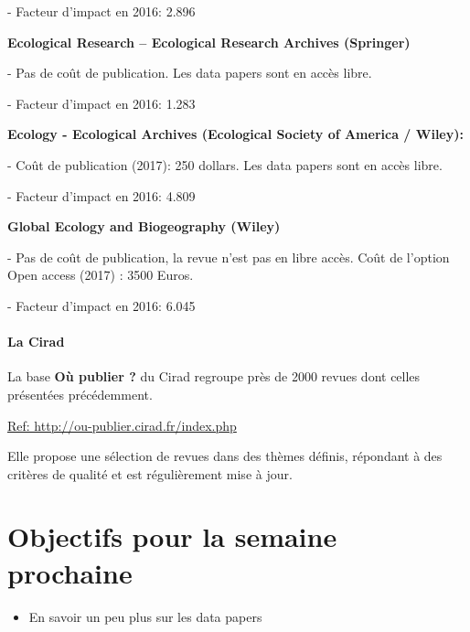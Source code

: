 \documentclass[11pt,oneside]{article}
\begin{document}
-	Facteur d'impact en 2016: 2.896

\begin{flushleft}
\textbf{Ecological Research – Ecological Research Archives (Springer) }
\end{flushleft}

-	Pas de coût de publication. Les data papers sont en accès libre.

-	Facteur d'impact en 2016: 1.283

\begin{flushleft}
\textbf{Ecology - Ecological Archives (Ecological Society of America / Wiley): }
\end{flushleft}

-	Coût de publication (2017): 250 dollars. Les data papers
sont en accès libre.

-	Facteur d'impact en 2016: 4.809

\begin{flushleft}
\textbf{Global Ecology and Biogeography (Wiley)}
\end{flushleft}

-	Pas de coût de publication, la revue n’est pas en libre accès. Coût de l’option Open access
(2017) : 3500 Euros.

-	Facteur d'impact en 2016: 6.045

\newpage

\subsection*{La Cirad}

\begin{flushleft}
La base \textbf{Où publier ?} du Cirad regroupe près de 2000 revues dont celles présentées précédemment.
\end{flushleft}


\begin{flushleft}
\url{ Ref: http://ou-publier.cirad.fr/index.php}
\end{flushleft}

Elle propose une sélection de revues dans des thèmes définis, répondant à des critères de qualité et est régulièrement mise à jour.

\newpage
\part*{Objectifs pour la semaine prochaine}
\begin{itemize}
	\item En savoir un peu plus sur les data papers
\end{itemize}
\end{document}
